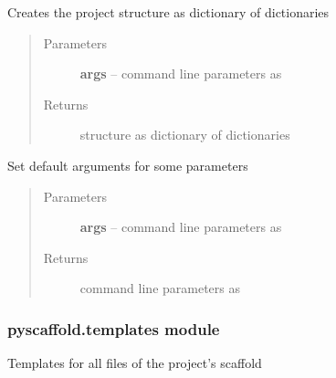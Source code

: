 \documentclass[letterpaper,10pt,english]{sphinxmanual}
\begin{document}

\begin{fulllineitems}
\label{_rst/pyscaffold:pyscaffold.structure.make_structure}
Creates the project structure as dictionary of dictionaries
\begin{quote}\begin{description}
\item[{Parameters}] \leavevmode
\textbf{args} -- command line parameters as \href{http://docs.python.org/2.7/library/argparse.html\#argparse.Namespace}{}

\item[{Returns}] \leavevmode
structure as dictionary of dictionaries

\end{description}\end{quote}

\end{fulllineitems}


\begin{fulllineitems}
\label{_rst/pyscaffold:pyscaffold.structure.set_default_args}
Set default arguments for some parameters
\begin{quote}\begin{description}
\item[{Parameters}] \leavevmode
\textbf{args} -- command line parameters as \href{http://docs.python.org/2.7/library/argparse.html\#argparse.Namespace}{}

\item[{Returns}] \leavevmode
command line parameters as \href{http://docs.python.org/2.7/library/argparse.html\#argparse.Namespace}{}

\end{description}\end{quote}

\end{fulllineitems}



\subsubsection{pyscaffold.templates module}
\label{_rst/pyscaffold:pyscaffold-templates-module}\label{_rst/pyscaffold:module-pyscaffold.templates}
Templates for all files of the project's scaffold
\end{document}

